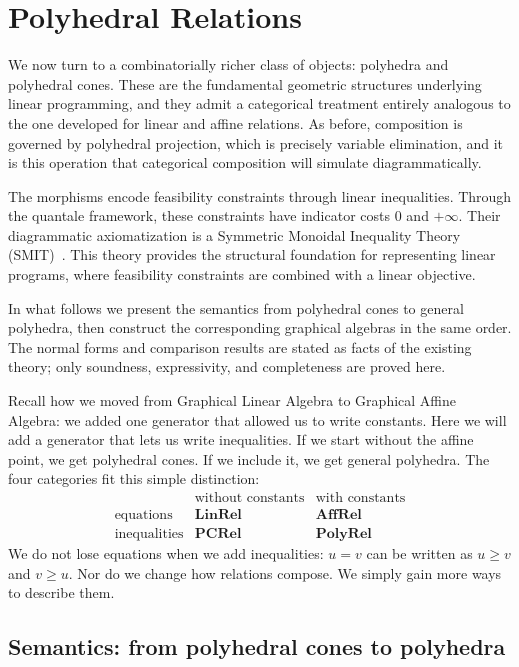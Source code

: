 \chapter{Polyhedral Relations}\label{sec:gpa}

We now turn to a combinatorially richer class of objects: polyhedra and polyhedral
cones. These are the fundamental geometric structures underlying linear
programming, and they admit a categorical treatment entirely analogous to
the one developed for linear and affine relations.
As before, composition is governed by polyhedral projection,
which is precisely variable elimination, and it is this
operation that categorical composition will simulate diagrammatically.

The morphisms encode feasibility constraints through linear inequalities.
Through the quantale framework, these constraints have indicator costs $0$ and
$+\infty$. Their diagrammatic axiomatization is a Symmetric Monoidal
Inequality Theory (SMIT)~\cite{bonchi2021polyhedral}. This theory provides the
structural foundation for representing linear programs, where feasibility
constraints are combined with a linear objective.

In what follows we present the semantics from polyhedral cones to general
polyhedra, then construct the corresponding graphical algebras in the same
order. The normal forms and comparison results are stated as facts of the
existing theory; only soundness, expressivity, and completeness are proved here.

Recall how we moved from Graphical Linear Algebra to Graphical Affine Algebra: we added
one generator that allowed us to write constants. Here we will add a
generator that lets us write inequalities. If we start without the affine
point, we get polyhedral cones. If we include it, we get general polyhedra.
The four categories fit this simple distinction:
\[
\begin{array}{c|cc}
 & \text{without constants} & \text{with constants}\\
\hline
\text{equations} & \mathbf{LinRel} & \mathbf{AffRel}\\
\text{inequalities} & \mathbf{PCRel} & \mathbf{PolyRel}
\end{array}
\]
We do not lose equations when we add inequalities: $u=v$ can be written
as $u\ge v$ and $v\ge u$. Nor do we change how relations compose.
We simply gain more ways to describe them.

\section{Semantics: from polyhedral cones to polyhedra}\label{sec:gpa-semantics}

